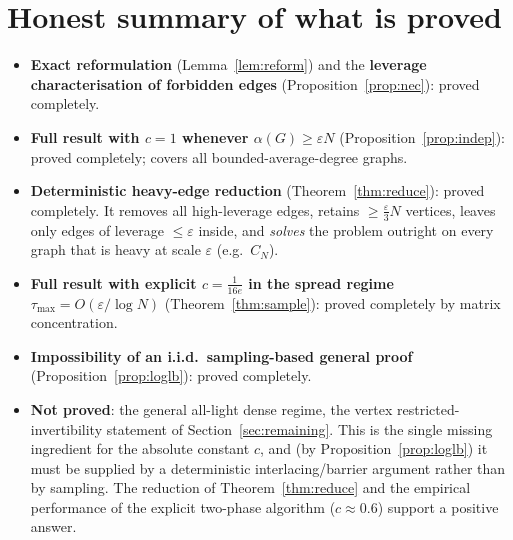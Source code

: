 \documentclass[12pt]{article}
\newcommand{\eps}{\varepsilon}
\theoremstyle{definition}
\begin{document}
\section*{Honest summary of what is proved}
\begin{itemize}
\item \textbf{Exact reformulation} (Lemma~\ref{lem:reform}) and the
\textbf{leverage characterisation of forbidden edges} (Proposition~\ref{prop:nec}):
proved completely.
\item \textbf{Full result with $c=1$ whenever $\alpha(G)\ge\eps N$}
(Proposition~\ref{prop:indep}): proved completely; covers all
bounded-average-degree graphs.
\item \textbf{Deterministic heavy-edge reduction} (Theorem~\ref{thm:reduce}):
proved completely. It removes all high-leverage edges, retains $\ge\tfrac{\eps}{3}N$
vertices, leaves only edges of leverage $\le\eps$ inside, and \emph{solves} the
problem outright on every graph that is heavy at scale $\eps$ (e.g.\ $C_N$).
\item \textbf{Full result with explicit $c=\tfrac{1}{16e}$ in the spread regime
$\tau_{\max}=O(\eps/\log N)$} (Theorem~\ref{thm:sample}): proved completely by
matrix concentration.
\item \textbf{Impossibility of an i.i.d.\ sampling-based general proof}
(Proposition~\ref{prop:loglb}): proved completely.
\item \textbf{Not proved}: the general all-light dense regime, the vertex
restricted-invertibility statement of Section~\ref{sec:remaining}. This is the
single missing ingredient for the absolute constant $c$, and (by
Proposition~\ref{prop:loglb}) it must be supplied by a deterministic
interlacing/barrier argument rather than by sampling. The reduction of
Theorem~\ref{thm:reduce} and the empirical performance of the explicit two-phase
algorithm ($c\approx0.6$) support a positive answer.
\end{itemize}
\end{document}
